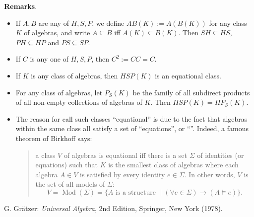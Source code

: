 \documentclass[12pt]{article}
\begin{document}
\textbf{Remarks}.  
\begin{itemize}
\item If $A,B$ are any of $H,S,P$, we define $AB(K):=A(B(K))$ for any class $K$ of algebras, and write $A\subseteq B$ iff $A(K)\subseteq B(K)$.  Then $SH\subseteq HS$, $PH\subseteq HP$ and $PS\subseteq SP$.
\item If $C$ is any one of $H,S,P$, then $C^2:=CC=C$.
\item If $K$ is any class of algebras, then $HSP(K)$ is an equational class.
\item For any class of algebras, let $P_S(K)$ be the family of all subdirect products of all non-empty collections of algebras of $K$.  Then $HSP(K)=HP_S(K)$.
\item
The reason for call such classes ``equational'' is due to the fact that algebras within the same class all satisfy a set of ``equations'', or ``''.  Indeed, a famous theorem of Birkhoff says:
\begin{quote}
a class $V$ of algebras is equational iff there is a set $\Sigma$ of identities (or equations) such that $K$ is the smallest class of algebras where each algebra $A\in V$ is satisfied by every identity $e\in \Sigma$.  In other words, $V$ is the set of all models of $\Sigma$: $$V=\operatorname{Mod}(\Sigma)=\lbrace A \mbox{ is a structure }\mid (\forall e\in \Sigma)\to(A\models e) \rbrace.$$
\end{quote}
\end{itemize}

\begin{thebibliography}{7}
 G. Gr\"{a}tzer: {\em Universal Algebra}, 2nd Edition, Springer, New York (1978).
\end{thebibliography}

\end{document}
